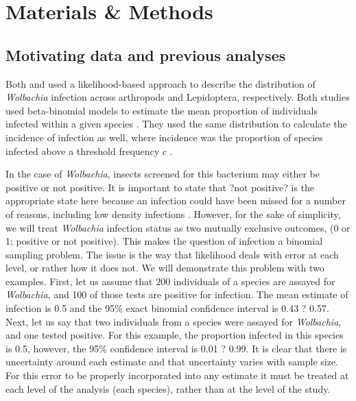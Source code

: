 \documentclass{frontiersSCNS} %
\begin{document}
\section{Materials \& Methods}
\subsection{Motivating data and previous analyses}

 Both \cite{Weinert:2015aa} and \cite{Ahmed:2015aa} used a likelihood-based approach to describe the distribution of \emph{Wolbachia} infection across arthropods and Lepidoptera, respectively. Both studies used beta-binomial models to estimate the mean proportion of individuals infected within a given species \citep{Hilgenboecker:2008aa}. They used the same distribution to calculate the incidence of infection as well, where incidence was the proportion of species infected above a threshold frequency $c$  \citep[i.e.,, one infection in 1000 individuals, or 0.001;][]{Weinert:2015aa}. 

In the case of \textit{Wolbachia}, insects screened for this bacterium may either be positive or not positive. It is important to state that ?not positive? is the appropriate state here because an infection could have been missed for a number of reasons, including low density infections \citep{Schneider:2014jv}. However, for the sake of simplicity, we will treat \textit{Wolbachia} infection status as two mutually exclusive outcomes, (0 or 1; positive or not positive). This makes the question of infection a binomial sampling problem. The issue is the way that likelihood deals with error at each level, or rather how it does not. We will demonstrate this problem with two examples. First, let us assume that 200 individuals of a species are assayed for \textit{Wolbachia}, and 100 of those tests are positive for infection. The mean estimate of infection is 0.5 and the 95\% exact binomial confidence interval is 0.43 ? 0.57. Next, let us say that two individuals from a species were assayed for \textit{Wolbachia}, and one tested positive. For this example, the proportion infected in this species is 0.5, however, the 95\% confidence interval is 0.01 ? 0.99. It is clear that there is uncertainty around each estimate and that uncertainty varies with sample size. For this error to be properly incorporated into any estimate it must be treated at each level of the analysis (each species), rather than at the level of the study. 
\end{document}
